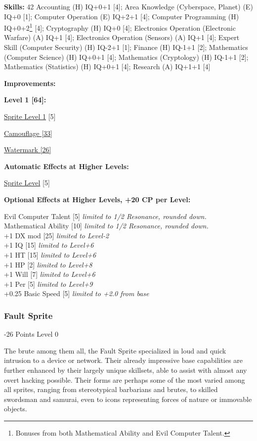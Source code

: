 \begin{multicols*}{3}
\textbf{Skills:} 42
Accounting (H) IQ+0+1 [4]; Area Knowledge (Cyberspace, Planet) (E) IQ+0 [1]; Computer Operation (E) IQ+2+1 [4]; Computer Programming (H) IQ+0+2\footnote{Bonuses from both Mathematical Ability and Evil Computer Talent.} [4]; Cryptography (H) IQ+0 [4]; Electronics Operation (Electronic Warfare) (A) IQ+1 [4]; Electronics Operation (Sensors) (A) IQ+1 [4]; Expert Skill (Computer Security) (H) IQ-2+1 [1]; Finance (H) IQ-1+1 [2]; Mathematics (Computer Science) (H) IQ+0+1 [4]; Mathematics (Cryptology) (H) IQ-1+1 [2]; Mathematics (Statistics) (H) IQ+0+1 [4]; Research (A) IQ+1+1 [4] 

\textbf{Improvements:}

\textbf{Level 1 [64]:}

\hyperref[sprite_level]{Sprite Level 1} [5]

\hyperref[camouflage]{Camouflage [33]}

\hyperref[watermark]{Watermark [26]}

\textbf{Automatic Effects at Higher Levels:}

\hyperref[sprite_level]{Sprite Level} [5]

\textbf{Optional Effects at Higher Levels, +20 CP per Level:}

Evil Computer Talent [5] \textit{limited to 1/2 Resonance, rounded down.}\\
Mathematical Ability [10] \textit{limited to 1/2 Resonance, rounded down.}\\
+1 DX mod [25] \textit{limited to Level-2}\\
+1 IQ [15] \textit{limited to Level+6}\\
+1 HT [15] \textit{limited to Level+6}\\
+1 HP [2] \textit{limited to Level+8}\\
+1 Will [7] \textit{limited to Level+6}\\
+1 Per [5] \textit{limited to Level+9}\\
+0.25 Basic Speed [5] \textit{limited to +2.0 from base}\\

\subsubsection{Fault Sprite}
\begin{flushright}
	-26 Points Level 0
\end{flushright}

The brute among them all, the Fault Sprite specialized in loud and quick intrusion to a device or network. Their already impressive base capabilities are further enhanced by their largely unique skillsets, able to assist with almost any overt hacking possible. Their forms are perhaps some of the most varied among all sprites, ranging from stereotypical barbarians and brutes, to skilled swordsman and samurai, even to icons representing forces of nature or immovable objects.


\end{multicols*}
